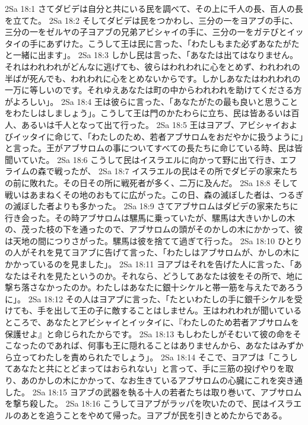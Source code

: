 2Sa 18:1  さてダビデは自分と共にいる民を調べて、その上に千人の長、百人の長を立てた。
2Sa 18:2  そしてダビデは民をつかわし、三分の一をヨアブの手に、三分の一をゼルヤの子ヨアブの兄弟アビシャイの手に、三分の一をガテびとイッタイの手にあずけた。こうして王は民に言った、「わたしもまた必ずあなたがたと一緒に出ます」。
2Sa 18:3  しかし民は言った、「あなたは出てはなりません。それはわれわれがどんなに逃げても、彼らはわれわれに心をとめず、われわれの半ばが死んでも、われわれに心をとめないからです。しかしあなたはわれわれの一万に等しいのです。それゆえあなたは町の中からわれわれを助けてくださる方がよろしい」。
2Sa 18:4  王は彼らに言った、「あなたがたの最も良いと思うことをわたしはしましょう」。こうして王は門のかたわらに立ち、民は皆あるいは百人、あるいは千人となって出て行った。
2Sa 18:5  王はヨアブ、アビシャイおよびイッタイに命じて、「わたしのため、若者アブサロムをおだやかに扱うように」と言った。王がアブサロムの事についてすべての長たちに命じている時、民は皆聞いていた。
2Sa 18:6  こうして民はイスラエルに向かって野に出て行き、エフライムの森で戦ったが、
2Sa 18:7  イスラエルの民はその所でダビデの家来たちの前に敗れた。その日その所に戦死者が多く、二万に及んだ。
2Sa 18:8  そして戦いはあまねくその地のおもてに広がった。この日、森の滅ぼした者は、つるぎの滅ぼした者よりも多かった。
2Sa 18:9  さてアブサロムはダビデの家来たちに行き会った。その時アブサロムは騾馬に乗っていたが、騾馬は大きいかしの木の、茂った枝の下を通ったので、アブサロムの頭がそのかしの木にかかって、彼は天地の間につりさがった。騾馬は彼を捨てて過ぎて行った。
2Sa 18:10  ひとりの人がそれを見てヨアブに告げて言った、「わたしはアブサロムが、かしの木にかかっているのを見ました」。
2Sa 18:11  ヨアブはそれを告げた人に言った、「あなたはそれを見たというのか。それなら、どうしてあなたは彼をその所で、地に撃ち落さなかったのか。わたしはあなたに銀十シケルと帯一筋を与えたであろうに」。
2Sa 18:12  その人はヨアブに言った、「たといわたしの手に銀千シケルを受けても、手を出して王の子に敵することはしません。王はわれわれが聞いているところで、あなたとアビシャイとイッタイに、『わたしのため若者アブサロムを保護せよ』と命じられたからです。
2Sa 18:13  もしわたしがそむいて彼の命をそこなったのであれば、何事も王に隠れることはありませんから、あなたはみずから立ってわたしを責められたでしょう」。
2Sa 18:14  そこで、ヨアブは「こうしてあなたと共にとどまってはおられない」と言って、手に三筋の投げやりを取り、あのかしの木にかかって、なお生きているアブサロムの心臓にこれを突き通した。
2Sa 18:15  ヨアブの武器を執る十人の若者たちは取り巻いて、アブサロムを撃ち殺した。
2Sa 18:16  こうしてヨアブがラッパを吹いたので、民はイスラエルのあとを追うことをやめて帰った。ヨアブが民を引きとめたからである。
